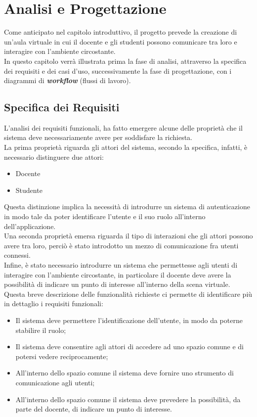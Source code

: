 \chapter{Analisi e Progettazione}
Come anticipato nel capitolo introduttivo, il progetto prevede la creazione di un'aula virtuale in cui il docente e gli studenti possono comunicare tra loro e interagire con l'ambiente circostante.
\\In questo capitolo verrà illustrata prima la fase di analisi, attraverso la specifica dei requisiti e dei casi d'uso, successivamente la fase di progettazione, con i diagrammi di \textbf{\textit{workflow}} (flussi di lavoro).
\section{Specifica dei Requisiti}
L'analisi dei requisiti funzionali, ha fatto emergere alcune delle proprietà che il sistema deve necessariamente avere per soddisfare la richiesta.
\\La prima proprietà riguarda gli attori del sistema, secondo la specifica, infatti, è necessario
distinguere due attori:
\begin{itemize}
    \item Docente
    \item Studente
\end{itemize} 
Questa distinzione implica la necessità di introdurre un sistema di autenticazione
in modo tale da poter identificare l'utente e il suo ruolo all'interno
dell'applicazione.\\
Una seconda proprietà emersa riguarda il tipo di interazioni che gli attori
possono avere tra loro, perciò è stato introdotto un mezzo di comunicazione fra utenti connessi.
\\Infine, è stato necessario introdurre un sistema che permettesse agli utenti
di interagire con l'ambiente circostante, in particolare il docente deve avere la
possibilità di indicare un punto di interesse all'interno della scena virtuale.\\
Questa breve descrizione delle funzionalità richieste ci permette di identificare
più in dettaglio i requisiti funzionali:
\begin{itemize}
    \item Il sistema deve permettere l'identificazione dell'utente, in modo da poterne
     stabilire il ruolo; 
     \item Il sistema deve consentire agli attori di accedere ad uno spazio comune e
di potersi vedere reciprocamente;
     \item All'interno dello spazio comune il sistema deve fornire uno strumento di
comunicazione agli utenti;
     \item All'interno dello spazio comune il sistema deve prevedere la possibilità, da
parte del docente, di indicare un punto di interesse.
\end{itemize} 
